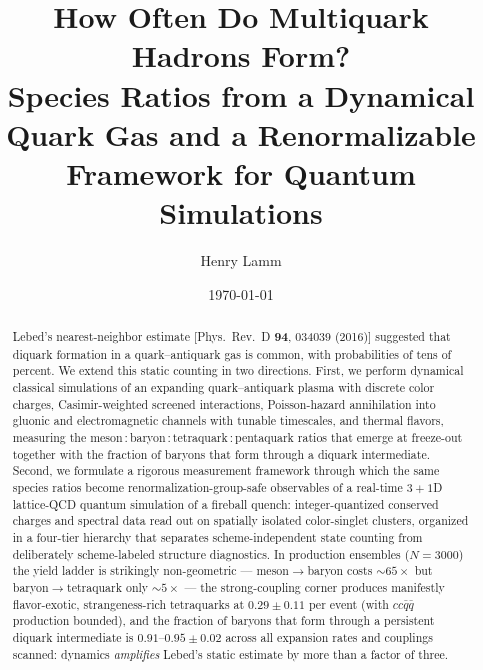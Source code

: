 \documentclass[aps,prd,twocolumn,superscriptaddress,nofootinbib]{revtex4-2}
\begin{document}
\title{How Often Do Multiquark Hadrons Form?\\
Species Ratios from a Dynamical Quark Gas and a Renormalizable
Framework for Quantum Simulations}

\author{Henry Lamm}

\date{\today}

\begin{abstract}
Lebed's nearest-neighbor estimate [Phys.\ Rev.\ D \textbf{94}, 034039 (2016)]
suggested that diquark formation in a quark--antiquark gas is common, with
probabilities of tens of percent.  We extend this static counting in two
directions.  First, we perform dynamical classical simulations of an
expanding quark--antiquark plasma with discrete color charges,
Casimir-weighted screened interactions, Poisson-hazard annihilation into
gluonic and electromagnetic channels with tunable timescales, and thermal
flavors, measuring the meson\,:\,baryon\,:\,tetraquark\,:\,pentaquark ratios
that emerge at freeze-out together with the fraction of baryons that form
through a diquark intermediate.  Second, we formulate a rigorous
measurement framework through which the same species ratios become
renormalization-group-safe observables of a real-time $3{+}1$D lattice-QCD
quantum simulation of a fireball quench: integer-quantized conserved
charges and spectral data read out on spatially isolated color-singlet
clusters, organized in a four-tier hierarchy that separates
scheme-independent state counting from deliberately scheme-labeled
structure diagnostics.  In production ensembles ($N=3000$) the yield
ladder is strikingly non-geometric --- meson$\to$baryon costs
$\sim65\times$ but baryon$\to$tetraquark only $\sim5\times$ --- the
strong-coupling corner produces manifestly flavor-exotic,
strangeness-rich tetraquarks at $0.29\pm0.11$ per event (with
$cc\bar q\bar q$ production bounded), and the fraction of baryons that
form through
a persistent diquark intermediate is $0.91$--$0.95\pm0.02$ across all
expansion rates and couplings scanned: dynamics \emph{amplifies}
Lebed's static estimate by more than a factor of three.
\end{abstract}

\maketitle












\end{document}
